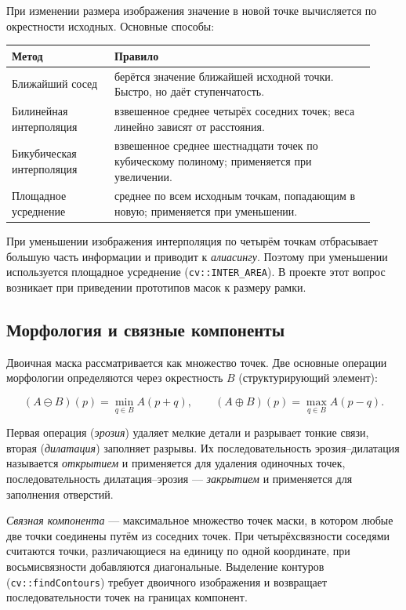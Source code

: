 \documentclass[11pt,a4paper]{article}
\theoremstyle{definition}
\theoremstyle{remark}
\begin{document}
При изменении размера изображения значение в новой точке вычисляется по
окрестности исходных. Основные способы:

\begin{center}
\begin{tabular}{p{0.26\linewidth}p{0.66\linewidth}}
\toprule
Метод & Правило \\
\midrule
Ближайший сосед & берётся значение ближайшей исходной точки. Быстро, но
даёт ступенчатость. \\
Билинейная интерполяция & взвешенное среднее четырёх соседних точек; веса
линейно зависят от расстояния. \\
Бикубическая интерполяция & взвешенное среднее шестнадцати точек по
кубическому полиному; применяется при увеличении. \\
Площадное усреднение & среднее по всем исходным точкам, попадающим в новую;
применяется при уменьшении. \\
\bottomrule
\end{tabular}
\end{center}

При уменьшении изображения интерполяция по четырём точкам отбрасывает
большую часть информации и приводит к \emph{алиасингу}. Поэтому при
уменьшении используется площадное усреднение
(\texttt{cv::INTER\_AREA}). В проекте этот вопрос возникает при приведении
прототипов масок к размеру рамки.

\subsection{Морфология и связные компоненты}

Двоичная маска рассматривается как множество точек. Две основные операции
морфологии определяются через окрестность $B$ (структурирующий элемент):

\[
  (A \ominus B)(p) = \min_{q \in B} A(p + q), \qquad
  (A \oplus B)(p) = \max_{q \in B} A(p - q).
\]

Первая операция (\emph{эрозия}) удаляет мелкие детали и разрывает тонкие
связи, вторая (\emph{дилатация}) заполняет разрывы. Их последовательность
эрозия--дилатация называется \emph{открытием} и применяется для удаления
одиночных точек, последовательность дилатация--эрозия --- \emph{закрытием} и
применяется для заполнения отверстий.

\emph{Связная компонента} --- максимальное множество точек маски, в котором
любые две точки соединены путём из соседних точек. При четырёхсвязности
соседями считаются точки, различающиеся на единицу по одной координате, при
восьмисвязности добавляются диагональные. Выделение контуров
(\texttt{cv::findContours}) требует двоичного изображения и возвращает
последовательности точек на границах компонент.
\end{document}

